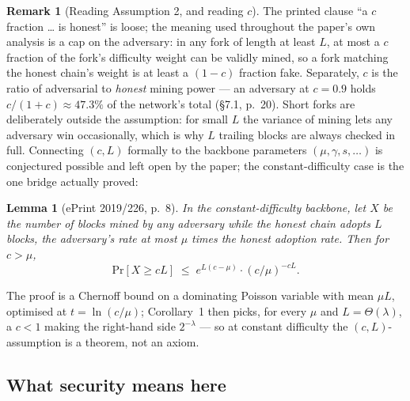 \documentclass[11pt,a4paper]{article}
\theoremstyle{definition}
\newtheorem{remark}[theorem]{Remark}
\renewcommand{\Pr}{\mathrm{Pr}}
\begin{document}
\begin{remark}[Reading Assumption 2, and reading $c$]\label{rem:fc-c-meaning}
The printed clause ``a $c$ fraction \dots{} is honest'' is loose; the
meaning used throughout the paper's own analysis is a cap on the
adversary: in any fork of length at least $L$, at most a $c$ fraction of
the fork's difficulty weight can be validly mined, so a fork matching the
honest chain's weight is at least a $(1-c)$ fraction fake. Separately, $c$
is the ratio of adversarial to \emph{honest} mining power --- an adversary
at $c = 0.9$ holds $c/(1+c) \approx 47.3\%$ of the network's total
(\S7.1, p.~20). Short forks are deliberately outside the assumption: for
small $L$ the variance of mining lets any adversary win occasionally,
which is why $L$ trailing blocks are always checked in full. Connecting
$(c, L)$ formally to the backbone parameters $(\mu, \gamma, s, \dots)$ is
conjectured possible and left open by the paper; the constant-difficulty
case is the one bridge actually proved:
\end{remark}

\noindent\textbf{Lemma 1} (ePrint 2019/226, p.~8). \emph{In the
constant-difficulty backbone, let $X$ be the number of blocks mined by any
adversary while the honest chain adopts $L$ blocks, the adversary's rate
at most $\mu$ times the honest adoption rate. Then for $c > \mu$,}
\[
\Pr[X \ge c L] \;\le\; e^{L(c-\mu)} \cdot (c/\mu)^{-cL}.
\]

The proof is a Chernoff bound on a dominating Poisson variable with mean
$\mu L$, optimised at $t = \ln(c/\mu)$; Corollary~1 then picks, for every
$\mu$ and $L = \Theta(\lambda)$, a $c < 1$ making the right-hand side
$2^{-\lambda}$ --- so at constant difficulty the $(c, L)$-assumption is a
theorem, not an axiom.

\subsection{What security means here}\label{sec:fc-defs}
\end{document}
